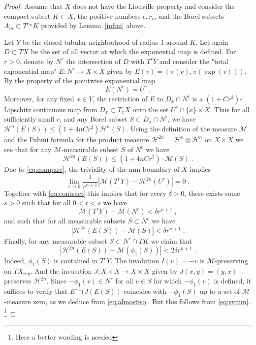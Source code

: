 \documentclass[12pt,leqno]{amsart}
\numberwithin{equation}{section}
\theoremstyle{definition}
\theoremstyle{remark}
\newcommand{\lref}[1]{Lemma~\ref{#1}}
\def\:{\colon}
\begin{document}
\begin{proof}
Assume that $X$ does not have the Liouville property and consider the compact subset $K \subset X$, the positive numbers $\epsilon, r_m$ and the Borel
subsets $A_m\subset T^{r_m} K$ provided by \lref{infini} above.

Let $Y$ be the closed tubular neighborhood  of radius $1$ around $K$.
Let again $D\subset TX$ be the set of all vector at which the exponential map is defined.
  For $r>0$, denote  by $N^r$ the intersection of $D$ with $T^r Y$ and consider the "total exponential map"
$E\:N^r \to X\times X$ given by $E(v)= (\pi (v), \pi (\exp (v)))$.  By the property of the pointwise exponential map
\begin{equation} \label{eq:image}
E(N^r) =U^r \; .
\end{equation}
Moreover, for any  fixed $x \in Y$, the restriction of $E$ to $D_x \cap N^r$ is
a $(1+ C r^2)$-Lipschitz continuous map from $D_x\subset T_xX$ onto the set  $U^r \cap \{x \} \times X$.
Thus for all sufficiently small $r$, and any Borel subset $S\subset D_x \cap N^r$, we have
$\mathcal H^n (E(S)) \leq (1+4n C r^2) \mathcal H^n (S)$.  Using the definition of the measure $\mathcal M$ and  the Fubini formula for the product measure
$\mathcal H^{2n} =\mathcal H^n \otimes \mathcal H^n $ on $X\times X$ we see that for any $\mathcal M$-measurable subset $S$ of $N^r$
we have 
\begin{equation} \label{eq:contract}
\mathcal H^{2n} (E(S)) \leq (1+4nC r^2) \cdot \mathcal M(S)\; .
\end{equation}
Due to \eqref{eq:compare}, the triviality of the mm-boundary of $X$ implies 
$$\lim _{r\to 0} \frac 1 {r^{n+1} } |\mathcal M(T^r Y) -\mathcal H^{2n} (U^r)| =0 \;.$$
	Together with  \eqref{eq:contract} this implies that for every  $\delta >0$, there exists some $s>0$ such that for all $0<r<s$
	we have 
	\begin{equation}  \label{eq:almostall}
	\mathcal M (T^r Y)- \mathcal M (N^r) < \delta r^{n+1} \; ,
	\end{equation}
	and such that for all measurable subsets $S\subset N^r$ we have   
	\begin{equation}  \label{eq:almostiso}
	|\mathcal H^{2n} (E(S)) - \mathcal M  (S)|  < \delta r^{n+1} \;.
\end{equation}
Finally, for any measurable subset $S\subset N^r \cap TK$  we claim  that
\begin{equation} \label{eq:finally}
|\mathcal H^{2n} (E(S)) - \mathcal M (\phi _1 (S))|  <  2 \delta r^{n+1} \; .
\end{equation}
Indeed, $\phi _1 (S)$ is contained in $T^rY$. The involution  $I(v)=-v$ is $\mathcal M$-preserving on $TX_{reg}$.  And the involution
 $J\:X\times X\to X\times X$ given by $J(x,y)=(y,x)$ preserves $\mathcal H^{2n}$. 
 Since $-\phi _1 (v) \in N^r$ for all $v\in S$ for which $-\phi _1 (v)$ is defined, 
it suffices to verify that $E^{-1} (J (E(S)) $   coincides with $-\phi _1 (S)$ up to a set of $\mathcal M$-measure zero, as we deduce from \eqref{eq:almostiso}.
But this follows from \eqref{eq:symm}. \footnote{Here a better wording  is needed} 


\end{proof}
\end{document}
